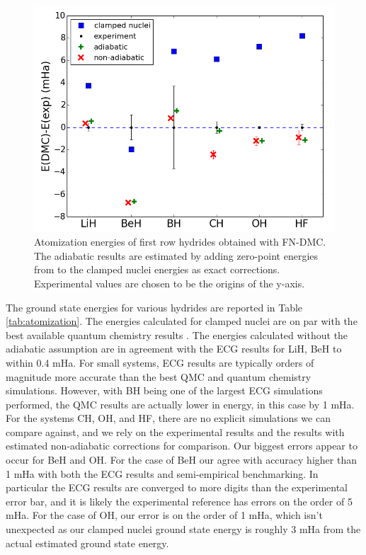 \documentclass[pra,superscriptaddress,groupedaddress,twocolumn]{revtex4}
\begin{document}
\begin{figure}
\centering
\includegraphics[scale=.4]{Figures/atomization}
\caption{Atomization energies of first row hydrides obtained with FN-DMC. The adiabatic results are estimated by adding zero-point energies from \cite{Feller_Corrections} to the clamped nuclei energies as exact corrections. Experimental values are chosen to be the origins of the y-axis.}
\end{figure}

The ground state energies for various hydrides are reported in Table \ref{tab:atomization}. The energies calculated for clamped nuclei are on par with the best available quantum chemistry results \cite{Adamowicz_LiH,Koput_BeH,Miliordos_BH}. The energies calculated without the adiabatic assumption are in agreement with the ECG results for LiH, BeH to within 0.4 mHa. For small systems, ECG results are typically orders of magnitude more accurate than the best QMC and quantum chemistry simulations. However, with BH being one of the largest ECG simulations performed, the QMC results are actually lower in energy, in this case by 1 mHa. For the systems CH, OH, and HF, there are no explicit simulations we can compare against, and we rely on the experimental results and the results with estimated non-adiabatic corrections for comparison. Our biggest errors appear to occur for BeH and OH.   For the case of BeH our agree with accuracy higher than 1 mHa with both the ECG results and semi-empirical benchmarking. In particular the ECG results are converged to more digits than the experimental error bar, and it is likely the experimental reference has errors on the order of 5 mHa.   For the case of OH, our error is on the order of 1 mHa, which isn't unexpected as our clamped nuclei ground state energy is roughly 3 mHa from the actual estimated ground state energy.
\end{document}
